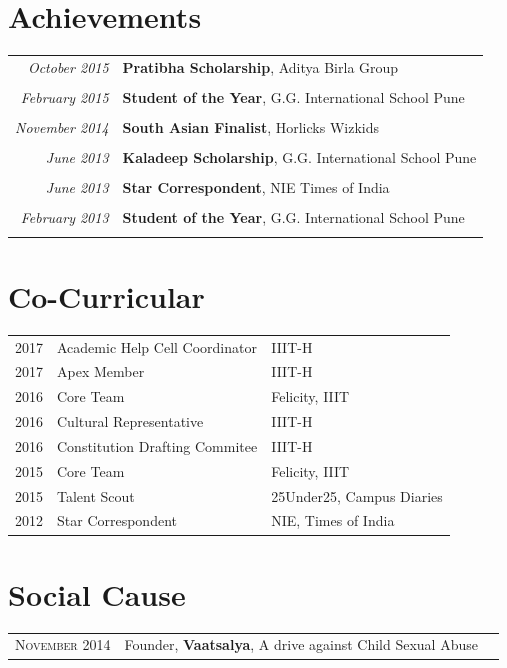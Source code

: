 \documentclass[a4paper,10pt]{article}
\begin{document}
\section{Achievements}
\begin{tabular}{r|p{11cm}}


 \emph{October 2015} & \textbf{Pratibha Scholarship}, Aditya Birla Group\\\multicolumn{2}{c}{} \\
 
  \emph{February 2015} & \textbf{Student of the Year}, G.G. International School Pune\\\multicolumn{2}{c}{} \\
 

 \emph{November 2014} & \textbf{South Asian Finalist}, Horlicks Wizkids\\\multicolumn{2}{c}{} \\
 
 \emph{June 2013} & \textbf{Kaladeep Scholarship}, G.G. International School Pune\\\multicolumn{2}{c}{} \\
 
 
 \emph{June 2013} &\textbf{ Star Correspondent}, NIE Times of India\\\multicolumn{2}{c}{} \\
 
   \emph{February 2013} & \textbf{Student of the Year}, G.G. International School Pune\\\multicolumn{2}{c}{} \\
 
\end{tabular}






\section{Co-Curricular}


 \begin{tabular}{rll}
2017 	&Academic Help Cell Coordinator   &IIIT-H\\
2017 	&Apex Member    &IIIT-H\\
2016     &Core Team  &Felicity, IIIT \\
2016    &Cultural Representative   &IIIT-H\\
2016   &Constitution Drafting Commitee  &IIIT-H\\
2015     &Core Team  &Felicity, IIIT \\
2015   &Talent Scout   &25Under25, Campus Diaries\\
2012   &Star Correspondent   &NIE, Times of India\\
\end{tabular}
 
\section{Social Cause}


 \begin{tabular}{rll}
 \textsc{November} 2014 & Founder, \textbf{Vaatsalya}, A drive against Child Sexual Abuse\\
\end{tabular}



\newpage
\end{document}
